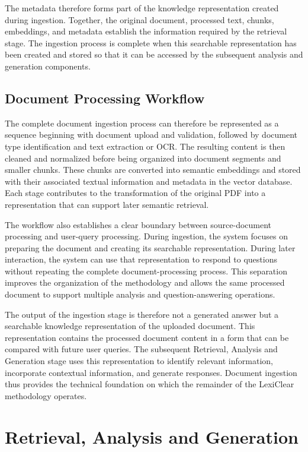 \documentclass[12pt,a4paper,oneside]{report}
\begin{document}
The metadata therefore forms part of the knowledge representation created
during ingestion. Together, the original document, processed text, chunks,
embeddings, and metadata establish the information required by the
retrieval stage. The ingestion process is complete when this searchable
representation has been created and stored so that it can be accessed by
the subsequent analysis and generation components.

\subsection{Document Processing Workflow}

The complete document ingestion process can therefore be represented as a
sequence beginning with document upload and validation, followed by document
type identification and text extraction or OCR. The resulting content is
then cleaned and normalized before being organized into document segments
and smaller chunks. These chunks are converted into semantic embeddings and
stored with their associated textual information and metadata in the vector
database. Each stage contributes to the transformation of the original PDF
into a representation that can support later semantic retrieval.

The workflow also establishes a clear boundary between source-document
processing and user-query processing. During ingestion, the system focuses
on preparing the document and creating its searchable representation.
During later interaction, the system can use that representation to respond
to questions without repeating the complete document-processing process.
This separation improves the organization of the methodology and allows the
same processed document to support multiple analysis and question-answering
operations.

The output of the ingestion stage is therefore not a generated answer but a
searchable knowledge representation of the uploaded document. This
representation contains the processed document content in a form that can be
compared with future user queries. The subsequent Retrieval, Analysis and
Generation stage uses this representation to identify relevant information,
incorporate contextual information, and generate responses. Document
ingestion thus provides the technical foundation on which the remainder of
the LexiClear methodology operates.

\section{Retrieval, Analysis and Generation}
\end{document}
